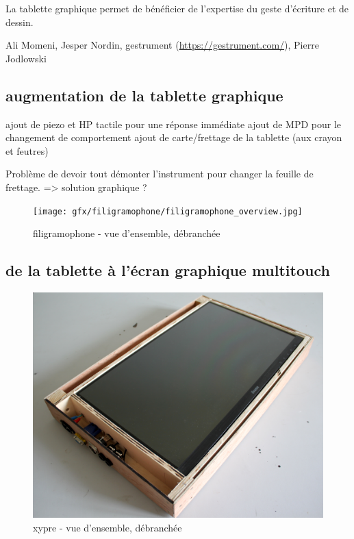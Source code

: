La tablette graphique permet de bénéficier de l’expertise du geste d’écriture et de dessin.

Ali Momeni, Jesper Nordin, gestrument (\url{https://gestrument.com/}), Pierre Jodlowski


\subsection{augmentation de la tablette graphique}
ajout de piezo et HP tactile pour une réponse immédiate
ajout de MPD pour le changement de comportement
ajout de carte/frettage de la tablette (aux crayon et feutres)

Problème de devoir tout démonter l'instrument pour changer la feuille de frettage. => solution graphique ?

\begin{figure}[!htbp]
	\texttt{[image: gfx/filigramophone/filigramophone\_overview.jpg]}
	\caption{filigramophone - vue d'ensemble, débranchée}
	\label{fig:interface:filigramophone}
\end{figure}

\subsection{de la tablette à l'écran graphique multitouch}
\begin{figure}[!htbp]
	\includegraphics[width=\textwidth]{gfx/xypre/xypre_overview_unplugged.jpg}
	\caption{xypre - vue d'ensemble, débranchée}
	\label{fig:interface:xypre}
\end{figure}

